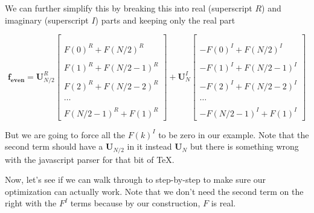 \documentclass[letterpaper,10pt,english]{/usr/lib/python2.7/site-packages/sphinx/texinputs/sphinxhowto}
\begin{document}
We can further simplify this by breaking this into real (superscript
$R$) and imaginary (superscript $I$) parts and keeping only the real
part

\[\mathbf{f_{even}} = \mathbf{U}_{N/2}^R
\begin{bmatrix}\\\\
F(0)^R+F(N/2)^R \\\\
F(1)^R+F(N/2-1)^R \\\\
F(2)^R+F(N/2-2)^R \\\\
\dots \\\\
F(N/2-1)^R+F(1)^R 
\end{bmatrix}
+
\mathbf{U}^I_N
\begin{bmatrix} \\\\
-F(0)^I+F(N/2)^I  \\\\
-F(1)^I+F(N/2-1)^I  \\\\
-F(2)^I+F(N/2-2)^I  \\\\
\dots \\\\
-F(N/2-1)^I+F(1)^I 
\end{bmatrix}\]

But we are going to force all the $F(k)^I$ to be zero in our example.
Note that the second term should have a $\mathbf{U}_{N/2}$ in it instead
$\mathbf{U}_N$ but there is something wrong with the javascript parser
for that bit of TeX.

Now, let's see if we can walk through to step-by-step to make sure our
optimization can actually work. Note that we don't need the second term
on the right with the $F^I$ terms because by our construction, $F$ is
real.


\end{document}
